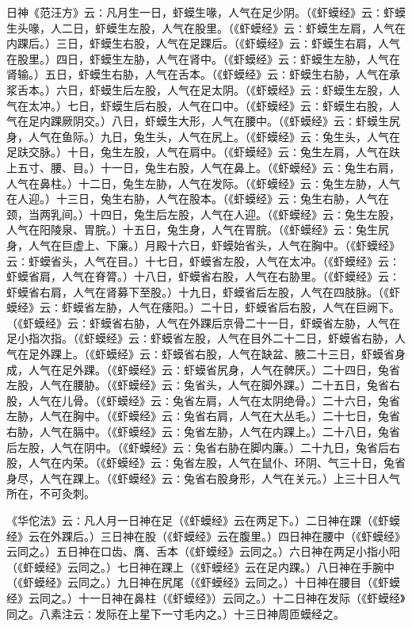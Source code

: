 \documentclass[a4paper,12pt,UTF8,twoside]{ctexbook}
\begin{document}
日神《范汪方》云∶凡月生一日，虾蟆生喙，人气在足少阴。（《虾蟆经》云∶虾蟆生头喙，人二日，虾蟆生左股，人气在股里。（《虾蟆经》云∶虾蟆生左肩，人气在内踝后。）三日，虾蟆生右股，人气在足踝后。（《虾蟆经》云∶虾蟆生右肩，人气在股里。）四日，虾蟆生左胁，人气在肾中。（《虾蟆经》云∶虾蟆生左胁，人气在肾输。）五日，虾蟆生右胁，人气在舌本。（《虾蟆经》云∶虾蟆生右胁，人气在承浆舌本。）六日，虾蟆生后左股，人气在足太阴。（《虾蟆经》云∶虾蟆生左股，人气在太冲。）七日，虾蟆生后右股，人气在口中。（《虾蟆经》云∶虾蟆生右股，人气在足内踝厥阴交。）八日，虾蟆生大形，人气在腰中。（《虾蟆经》云∶虾蟆生尻身，人气在鱼际。）九日，兔生头，人气在尻上。（《虾蟆经》云∶兔生头，人气在足趺交脉。）十日，兔生左股，人气在肩中。（《虾蟆经》云∶兔生左肩，人气在趺上五寸、腰、目。）十一日，兔生右股，人气在鼻上。（《虾蟆经》云∶兔生右肩，人气在鼻柱。）十二日，兔生左胁，人气在发际。（《虾蟆经》云∶兔生左胁，人气在人迎。）十三日，兔生右胁，人气在股本。（《虾蟆经》云∶兔生右胁，人气在颈，当两乳间。）十四日，兔生后左股，人气在人迎。（《虾蟆经》云∶兔生左股，人气在阳陵泉、胃脘。）十五日，兔生身，人气在胃脘。（《虾蟆经》云∶兔生尻身，人气在巨虚上、下廉。）月殿十六日，虾蟆始省头，人气在胸中。（《虾蟆经》云∶虾蟆省头，人气在目。）十七日，虾蟆省左股，人气在太冲。（《虾蟆经》云∶虾蟆省肩，人气在脊膂。）十八日，虾蟆省右股，人气在右胁里。（《虾蟆经》云∶虾蟆省右肩，人气在肾募下至股。）十九日，虾蟆省后左股，人气在四肢脉。（《虾蟆经》云∶虾蟆省左胁，人气在痿阳。）二十日，虾蟆省后右股，人气在巨阙下。（《虾蟆经》云∶虾蟆省右胁，人气在外踝后京骨二十一日，虾蟆省左胁，人气在足小指次指。（《虾蟆经》云∶虾蟆省左股，人气在目外二十二日，虾蟆省右胁，人气在足外踝上。（《虾蟆经》云∶虾蟆省右股，人气在缺盆、腋二十三日，虾蟆省身成，人气在足外踝。（《虾蟆经》云∶虾蟆省尻身，人气在髀厌。）二十四日，兔省左股，人气在腰胁。（《虾蟆经》云∶兔省头，人气在脚外踝。）二十五日，兔省右股，人气在儿骨。（《虾蟆经》云∶兔省左肩，人气在太阴绝骨。）二十六日，兔省左胁，人气在胸中。（《虾蟆经》云∶兔省右肩，人气在大丛毛。）二十七日，兔省右胁，人气在膈中。（《虾蟆经》云∶兔省左胁，人气在内踝上。）二十八日，兔省后左股，人气在阴中。（《虾蟆经》云∶兔省右胁在脚内廉。）二十九日，兔省后右股，人气在内荣。（《虾蟆经》云∶兔省左股，人气在鼠仆、环阴、气三十日，兔省身尽，人气在踝上。（《虾蟆经》云∶兔省右股身形，人气在关元。）上三十日人气所在，不可灸刺。

《华佗法》云∶凡人月一日神在足（《虾蟆经》云在两足下。）二日神在踝（《虾蟆经》云在外踝后。）三日神在股（《虾蟆经》云在腹里。）四日神在腰中（《虾蟆经》云同之。）五日神在口齿、膺、舌本（《虾蟆经》云同之。）六日神在两足小指小阳（《虾蟆经》云同之。）七日神在踝上（《虾蟆经》云在足内踝。）八日神在手腕中（《虾蟆经》云同之。）九日神在尻尾（《虾蟆经》云同之。）十日神在腰目（《虾蟆经》云同之。）十一日神在鼻柱（《虾蟆经》）云同之。）十二日神在发际（《虾蟆经》同之。八素注云∶发际在上星下一寸毛内之。）十三日神周匝蟆经之。
\end{document}
